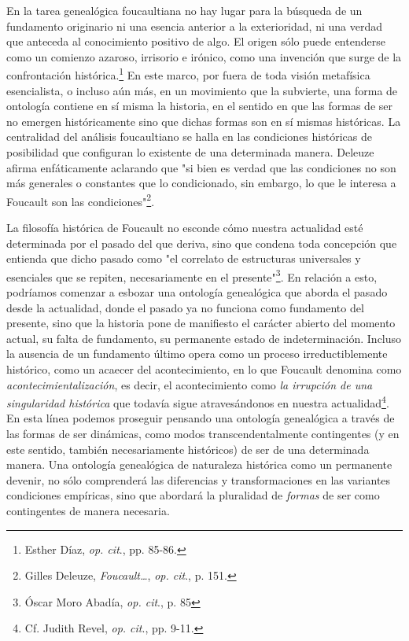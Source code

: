 \documentclass{book}
\begin{document}
En la tarea genealógica foucaultiana no hay lugar para la búsqueda de un
fundamento originario ni una esencia anterior a la exterioridad, ni una
verdad que anteceda al conocimiento positivo de algo. El origen sólo
puede entenderse como un comienzo azaroso, irrisorio e irónico, como una
invención que surge de la confrontación histórica.\footnote{Esther Díaz,
  \emph{op. cit}., pp. 85-86.} En este marco, por fuera de toda visión
metafísica esencialista, o incluso aún más, en un movimiento que la
subvierte, una forma de ontología contiene en sí misma la historia, en
el sentido en que las formas de ser no emergen históricamente sino que
dichas formas son en sí mismas históricas. La centralidad del análisis
foucaultiano se halla en las condiciones históricas de posibilidad que
configuran lo existente de una determinada manera. Deleuze afirma
enfáticamente aclarando que "si bien es verdad que las condiciones no
son más generales o constantes que lo condicionado, sin embargo, lo que
le interesa a Foucault son las condiciones"\footnote{Gilles Deleuze,
  \emph{Foucault\ldots{}}, \emph{op. cit}., p. 151.}.

La filosofía histórica de Foucault no esconde cómo nuestra actualidad
esté determinada por el pasado del que deriva, sino que condena toda
concepción que entienda que dicho pasado como "el correlato de
estructuras universales y esenciales que se repiten, necesariamente en
el presente"\footnote{Óscar Moro Abadía, \emph{op. cit}., p. 85}. En
relación a esto, podríamos comenzar a esbozar una ontología genealógica
que aborda el pasado desde la actualidad, donde el pasado ya no funciona
como fundamento del presente, sino que la historia pone de manifiesto el
carácter abierto del momento actual, su falta de fundamento, su
permanente estado de indeterminación. Incluso la ausencia de un
fundamento último opera como un proceso irreductiblemente histórico,
como un acaecer del acontecimiento, en lo que Foucault denomina como
\emph{acontecimientalización}, es decir, el acontecimiento como \emph{la
irrupción de una singularidad histórica} que todavía sigue
atravesándonos en nuestra actualidad\footnote{Cf. Judith Revel,
  \emph{op. cit}., pp. 9-11.}. En esta línea podemos proseguir pensando
una ontología genealógica a través de las formas de ser dinámicas, como
modos transcendentalmente contingentes (y en este sentido, también
necesariamente históricos) de ser de una determinada manera. Una
ontología genealógica de naturaleza histórica como un permanente
devenir, no sólo comprenderá las diferencias y transformaciones en las
variantes condiciones empíricas, sino que abordará la pluralidad de
\emph{formas} de ser como contingentes de manera necesaria.
\end{document}
